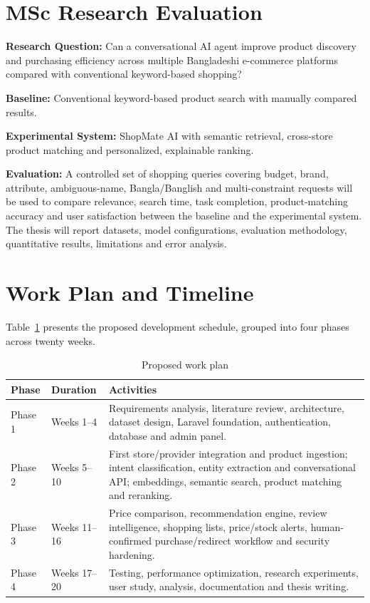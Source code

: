 \documentclass[12pt,a4paper]{article}
\begin{document}
\section{MSc Research Evaluation}

\noindent\textbf{Research Question:} Can a conversational AI agent improve product discovery and purchasing
efficiency across multiple Bangladeshi e-commerce platforms compared with conventional keyword-based shopping?

\noindent\textbf{Baseline:} Conventional keyword-based product search with manually compared results.

\noindent\textbf{Experimental System:} ShopMate AI with semantic retrieval, cross-store product matching and
personalized, explainable ranking.

\noindent\textbf{Evaluation:} A controlled set of shopping queries covering budget, brand, attribute,
ambiguous-name, Bangla/Banglish and multi-constraint requests will be used to compare relevance, search time, task
completion, product-matching accuracy and user satisfaction between the baseline and the experimental system. The
thesis will report datasets, model configurations, evaluation methodology, quantitative results, limitations and
error analysis.

\section{Work Plan and Timeline}

Table~\ref{tab:timeline} presents the proposed development schedule, grouped into four phases across twenty weeks.

\begin{table}[H]
\centering
\caption{Proposed work plan}
\label{tab:timeline}
\begin{tabular}{p{2.6cm}p{3.3cm}p{7.0cm}}
\toprule
\textbf{Phase} & \textbf{Duration} & \textbf{Activities} \\
\midrule
Phase 1 & Weeks 1--4 & Requirements analysis, literature review, architecture, dataset design, Laravel foundation, authentication, database and admin panel. \\
Phase 2 & Weeks 5--10 & First store/provider integration and product ingestion; intent classification, entity extraction and conversational API; embeddings, semantic search, product matching and reranking. \\
Phase 3 & Weeks 11--16 & Price comparison, recommendation engine, review intelligence, shopping lists, price/stock alerts, human-confirmed purchase/redirect workflow and security hardening. \\
Phase 4 & Weeks 17--20 & Testing, performance optimization, research experiments, user study, analysis, documentation and thesis writing. \\
\bottomrule
\end{tabular}
\end{table}
\end{document}
